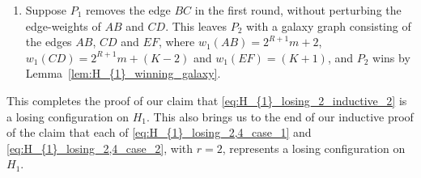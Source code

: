 \documentclass[11pt,reqno]{amsart}
\theoremstyle{definition}
\theoremstyle{definition}
\begin{document}
\begin{enumerate}
\begin{enumerate}
\item Suppose $k \in \{2,3,4\}$. If $k=2$, then the configuration after the first round is of the same form as in Lemma~\ref{prop:H_{1}_winning_1}, with $m_{1}=m_{2}=2^{R-1}m$ (since $2^{f(2)+1}=4$), $\ell_{1}=2$ and $\ell_{2}=(K-2)$, so that $k\in \{\ell_{1},\ell_{2}\}$, and hence, $P_{2}$ wins by Lemma~\ref{prop:H_{1}_winning_1}. If $k\in \{3,4\}$, $P_{2}$ removes weight $(K+1-k)$ from $CD$ during the second round, so that $P_{1}$ is left with 
\begin{align}
w_{2}(AB)=2^{R+1}m+2,\ w_{2}(BC)=1,\ w_{2}(CD)=2^{R+1}m+(k-3),\ w_{2}(EF)=k,\nonumber
\end{align}
which is of the form given by \eqref{eq:H_{1}_losing_0,1,3} with $r=0$ when $k=3$, and of the form given by \eqref{eq:H_{1}_losing_0,1,3} with $r=1$ when $k=4$, and by what we have already proved in \S\ref{subsec:proof_eq_H_{1}_losing_0} and \S\ref{subsec:H_{1}_losing_1_proof}, we conclude that $P_{1}$ loses.
\end{enumerate}

\item Suppose $P_{1}$ removes the edge $BC$ in the first round, without perturbing the edge-weights of $AB$ and $CD$. This leaves $P_{2}$ with a galaxy graph consisting of the edges $AB$, $CD$ and $EF$, where $w_{1}(AB)=2^{R+1}m+2$, $w_{1}(CD)=2^{R+1}m+(K-2)$ and $w_{1}(EF)=(K+1)$, and $P_{2}$ wins by Lemma~\ref{lem:H_{1}_winning_galaxy}. 
\end{enumerate}

This completes the proof of our claim that \eqref{eq:H_{1}_losing_2_inductive_2} is a losing configuration on $H_{1}$. This also brings us to the end of our inductive proof of the claim that each of \eqref{eq:H_{1}_losing_2,4_case_1} and \eqref{eq:H_{1}_losing_2,4_case_2}, with $r=2$, represents a losing configuration on $H_{1}$.
\end{document}
